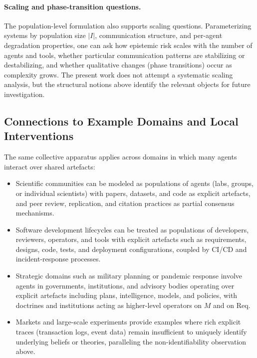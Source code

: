 \paragraph{Scaling and phase-transition questions.}
The population-level formulation also supports scaling questions. Parameterizing systems by population size $|I|$, communication structure, and per-agent degradation properties, one can ask how epistemic risk scales with the number of agents and tools, whether particular communication patterns are stabilizing or destabilizing, and whether qualitative changes (phase transitions) occur as complexity grows. The present work does not attempt a systematic scaling analysis, but the structural notions above identify the relevant objects for future investigation.

\subsection{Connections to Example Domains and Local Interventions}

The same collective apparatus applies across domains in which many agents interact over shared artefacts:
\begin{itemize}
  \item Scientific communities can be modeled as populations of agents (labs, groups, or individual scientists) with papers, datasets, and code as explicit artefacts, and peer review, replication, and citation practices as partial consensus mechanisms.
  \item Software development lifecycles can be treated as populations of developers, reviewers, operators, and tools with explicit artefacts such as requirements, designs, code, tests, and deployment configurations, coupled by CI/CD and incident-response processes.
  \item Strategic domains such as military planning or pandemic response involve agents in governments, institutions, and advisory bodies operating over explicit artefacts including plans, intelligence, models, and policies, with doctrines and institutions acting as higher-level operators on $M$ and on $\mathrm{Req}$.
  \item Markets and large-scale experiments provide examples where rich explicit traces (transaction logs, event data) remain insufficient to uniquely identify underlying beliefs or theories, paralleling the non-identifiability observation above.
\end{itemize}

